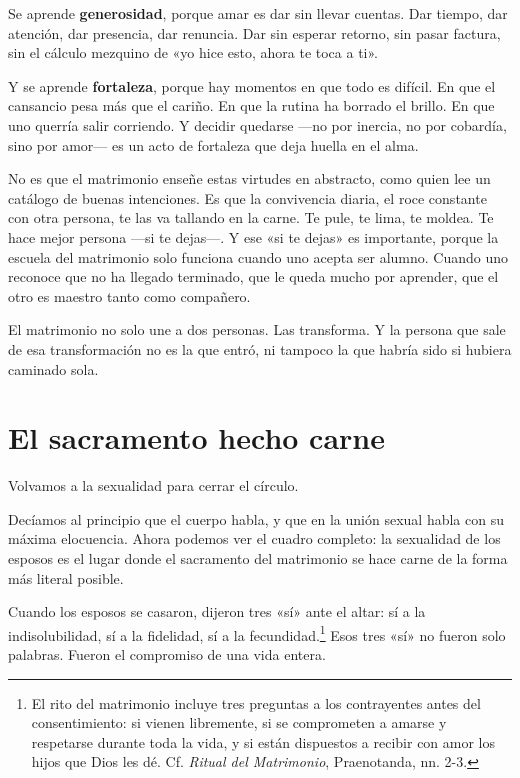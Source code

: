 Se aprende \textbf{generosidad}, porque amar es dar sin llevar cuentas. Dar tiempo, dar atención, dar presencia, dar renuncia. Dar sin esperar retorno, sin pasar factura, sin el cálculo mezquino de «yo hice esto, ahora te toca a ti».

Y se aprende \textbf{fortaleza}, porque hay momentos en que todo es difícil. En que el cansancio pesa más que el cariño. En que la rutina ha borrado el brillo. En que uno querría salir corriendo. Y decidir quedarse ---no por inercia, no por cobardía, sino por amor--- es un acto de fortaleza que deja huella en el alma.

No es que el matrimonio enseñe estas virtudes en abstracto, como quien lee un catálogo de buenas intenciones. Es que la convivencia diaria, el roce constante con otra persona, te las va tallando en la carne. Te pule, te lima, te moldea. Te hace mejor persona ---si te dejas---. Y ese «si te dejas» es importante, porque la escuela del matrimonio solo funciona cuando uno acepta ser alumno. Cuando uno reconoce que no ha llegado terminado, que le queda mucho por aprender, que el otro es maestro tanto como compañero.

El matrimonio no solo une a dos personas. Las transforma. Y la persona que sale de esa transformación no es la que entró, ni tampoco la que habría sido si hubiera caminado sola.

\section{El sacramento hecho carne}

Volvamos a la sexualidad para cerrar el círculo.

Decíamos al principio que el cuerpo habla, y que en la unión sexual habla con su máxima elocuencia. Ahora podemos ver el cuadro completo: la sexualidad de los esposos es el lugar donde el sacramento del matrimonio se hace carne de la forma más literal posible.

Cuando los esposos se casaron, dijeron tres «sí» ante el altar: sí a la indisolubilidad, sí a la fidelidad, sí a la fecundidad.\footnote{El rito del matrimonio incluye tres preguntas a los contrayentes antes del consentimiento: si vienen libremente, si se comprometen a amarse y respetarse durante toda la vida, y si están dispuestos a recibir con amor los hijos que Dios les dé. Cf. \textit{Ritual del Matrimonio}, Praenotanda, nn. 2-3.} Esos tres «sí» no fueron solo palabras. Fueron el compromiso de una vida entera.

